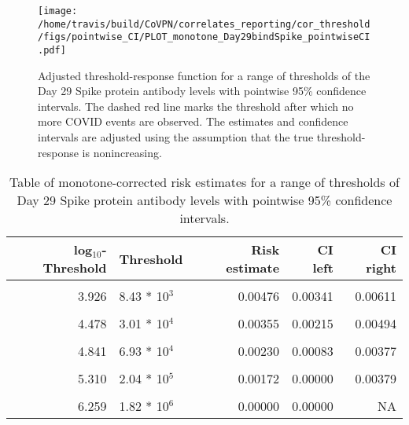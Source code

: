 \documentclass[]{book}
\theoremstyle{definition}
\theoremstyle{definition}
\theoremstyle{definition}
\newcommand{\1}{\mathbbm{1}}
\begin{document}
\begin{figure}[H]
\centering
\texttt{[image: /home/travis/build/CoVPN/correlates\_reporting/cor\_threshold/figs/pointwise\_CI/PLOT\_monotone\_Day29bindSpike\_pointwiseCI.pdf]}
\caption{Adjusted threshold-response function for a range of thresholds of the
  Day 29 Spike protein antibody levels with pointwise 95\% confidence intervals. The dashed red line marks the threshold after which no more COVID events are observed. The estimates and confidence intervals are adjusted using the assumption that the true threshold-response is nonincreasing.}
\end{figure}
\begin{table}[!h]

\caption{\label{tab:unnamed-chunk-371}Table of monotone-corrected risk estimates for a range of thresholds of Day 29 Spike protein antibody levels with pointwise 95\% confidence intervals.}
\centering
\begin{tabular}[t]{rlrrr}
\toprule
log$_{10}$-Threshold & Threshold & Risk estimate & CI left & CI right\\
\midrule
\cellcolor{gray!6}{3.202} & \cellcolor{gray!6}{1.59 * 10$^3$} & \cellcolor{gray!6}{0.00567} & \cellcolor{gray!6}{0.00427} & \cellcolor{gray!6}{0.00707}\\
3.926 & 8.43 * 10$^3$ & 0.00476 & 0.00341 & 0.00611\\
\cellcolor{gray!6}{4.187} & \cellcolor{gray!6}{1.54 * 10$^4$} & \cellcolor{gray!6}{0.00459} & \cellcolor{gray!6}{0.00317} & \cellcolor{gray!6}{0.00601}\\
4.478 & 3.01 * 10$^4$ & 0.00355 & 0.00215 & 0.00494\\
\cellcolor{gray!6}{4.658} & \cellcolor{gray!6}{4.55 * 10$^4$} & \cellcolor{gray!6}{0.00278} & \cellcolor{gray!6}{0.00138} & \cellcolor{gray!6}{0.00419}\\
4.841 & 6.93 * 10$^4$ & 0.00230 & 0.00083 & 0.00377\\
\cellcolor{gray!6}{5.022} & \cellcolor{gray!6}{1.05 * 10$^5$} & \cellcolor{gray!6}{0.00182} & \cellcolor{gray!6}{0.00031} & \cellcolor{gray!6}{0.00332}\\
5.310 & 2.04 * 10$^5$ & 0.00172 & 0.00000 & 0.00379\\
\cellcolor{gray!6}{5.523} & \cellcolor{gray!6}{3.33 * 10$^5$} & \cellcolor{gray!6}{0.00172} & \cellcolor{gray!6}{0.00000} & \cellcolor{gray!6}{0.00434}\\
6.259 & 1.82 * 10$^6$ & 0.00000 & 0.00000 & NA\\
\bottomrule
\end{tabular}
\end{table}
\end{document}
